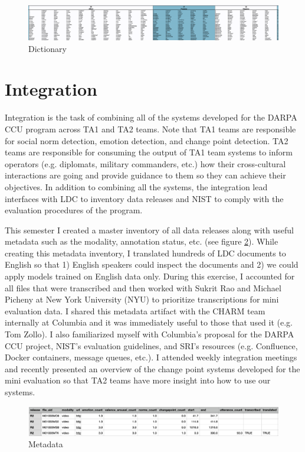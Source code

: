 \documentclass[12pt]{article}
\begin{document}
\begin{figure}[H]
    \centering
    \includegraphics[width=1.0\textwidth]{dictionary.png}
    \caption{Dictionary}
    \label{fig:dictionary}
\end{figure}

\section{Integration}
Integration is the task of combining all of the systems developed for the DARPA CCU program across TA1 and TA2 teams. Note that TA1 teams are responsible for social norm detection, emotion detection, and change point detection. TA2 teams are responsible for consuming the output of TA1 team systems to inform operators (e.g. diplomats, military commanders, etc.) how their cross-cultural interactions are going and provide guidance to them so they can achieve their objectives. In addition to combining all the systems, the integration lead interfaces with LDC to inventory data releases and NIST to comply with the evaluation procedures of the program.

This semester I created a master inventory of all data releases along with useful metadata such as the modality, annotation status, etc. (see figure 
\ref{fig:metadata}). While creating this metadata inventory, I translated hundreds of LDC documents to English so that 1) English speakers could inspect the documents and 2) we could apply models trained on English data only. During this exercise, I accounted for all files that were transcribed and then worked with Sukrit Rao and Michael Picheny at New York University (NYU) to prioritize transcriptions for mini evaluation data. I shared this metadata artifact with the CHARM team internally at Columbia and it was immediately useful to those that used it (e.g. Tom Zollo). I also familiarized myself with Columbia's proposal for the DARPA CCU project, NIST's evaluation guidelines, and SRI's resources (e.g. Confluence, Docker containers, message queues, etc.). I attended weekly integration meetings and recently presented an overview of the change point systems developed for the mini evaluation so that TA2 teams have more insight into how to use our systems.

\begin{figure}[H]
    \centering
    \includegraphics[width=1.0\textwidth]{metadata.png}
    \caption{Metadata}
    \label{fig:metadata}
\end{figure}
\end{document}
